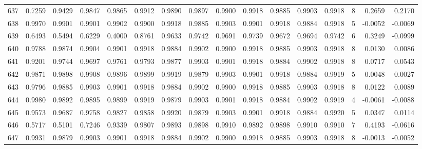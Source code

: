 \begin{tabular}{lrrrrrrrrrrrrrrr}
637 &      0.7259 &  0.9429 &  0.9847 &  0.9865 &  0.9912 &  0.9890 &  0.9897 &  0.9900 &  0.9918 &  0.9885 &   0.9903 &     0.9918 &      8 &                    0.2659 &                     0.2170 \\
638 &      0.9970 &  0.9901 &  0.9901 &  0.9902 &  0.9900 &  0.9918 &  0.9885 &  0.9903 &  0.9901 &  0.9918 &   0.9884 &     0.9918 &      5 &                   -0.0052 &                    -0.0069 \\
639 &      0.6493 &  0.5494 &  0.6229 &  0.4000 &  0.8761 &  0.9633 &  0.9742 &  0.9691 &  0.9739 &  0.9672 &   0.9694 &     0.9742 &      6 &                    0.3249 &                    -0.0999 \\
640 &      0.9788 &  0.9874 &  0.9904 &  0.9901 &  0.9918 &  0.9884 &  0.9902 &  0.9900 &  0.9918 &  0.9885 &   0.9903 &     0.9918 &      8 &                    0.0130 &                     0.0086 \\
641 &      0.9201 &  0.9744 &  0.9697 &  0.9761 &  0.9793 &  0.9877 &  0.9903 &  0.9901 &  0.9918 &  0.9884 &   0.9902 &     0.9918 &      8 &                    0.0717 &                     0.0543 \\
642 &      0.9871 &  0.9898 &  0.9908 &  0.9896 &  0.9899 &  0.9919 &  0.9879 &  0.9903 &  0.9901 &  0.9918 &   0.9884 &     0.9919 &      5 &                    0.0048 &                     0.0027 \\
643 &      0.9796 &  0.9885 &  0.9903 &  0.9901 &  0.9918 &  0.9884 &  0.9902 &  0.9900 &  0.9918 &  0.9885 &   0.9903 &     0.9918 &      8 &                    0.0122 &                     0.0089 \\
644 &      0.9980 &  0.9892 &  0.9895 &  0.9899 &  0.9919 &  0.9879 &  0.9903 &  0.9901 &  0.9918 &  0.9884 &   0.9902 &     0.9919 &      4 &                   -0.0061 &                    -0.0088 \\
645 &      0.9573 &  0.9687 &  0.9758 &  0.9827 &  0.9858 &  0.9920 &  0.9879 &  0.9903 &  0.9901 &  0.9918 &   0.9884 &     0.9920 &      5 &                    0.0347 &                     0.0114 \\
646 &      0.5717 &  0.5101 &  0.7246 &  0.9339 &  0.9807 &  0.9893 &  0.9898 &  0.9910 &  0.9892 &  0.9898 &   0.9910 &     0.9910 &      7 &                    0.4193 &                    -0.0616 \\
647 &      0.9931 &  0.9879 &  0.9903 &  0.9901 &  0.9918 &  0.9884 &  0.9902 &  0.9900 &  0.9918 &  0.9885 &   0.9903 &     0.9918 &      8 &                   -0.0013 &                    -0.0052 \\

\end{tabular}
